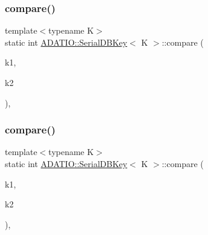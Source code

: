 \subsubsection{\texorpdfstring{compare()}{compare()}\hspace{0.1cm}{\footnotesize\ttfamily [1/2]}}
{\footnotesize\ttfamily template$<$typename K$>$ \\
static int \mbox{\hyperlink{classADATIO_1_1SerialDBKey}{A\+D\+A\+T\+I\+O\+::\+Serial\+D\+B\+Key}}$<$ K $>$\+::compare (\begin{DoxyParamCaption}\item[{const \mbox{\hyperlink{other__libs_2filedb_2filehash_2ffdb__db_8h_aa2e0984399491df0fdd20898ca8758f9}{F\+F\+D\+B\+\_\+\+D\+BT}} $\ast$}]{k1,  }\item[{const \mbox{\hyperlink{other__libs_2filedb_2filehash_2ffdb__db_8h_aa2e0984399491df0fdd20898ca8758f9}{F\+F\+D\+B\+\_\+\+D\+BT}} $\ast$}]{k2 }\end{DoxyParamCaption})\hspace{0.3cm}{\ttfamily [inline]}, {\ttfamily [static]}}

\mbox{\label{classADATIO_1_1SerialDBKey_a5f73c31df1c824c61790ab7645fc030f}} 
\subsubsection{\texorpdfstring{compare()}{compare()}\hspace{0.1cm}{\footnotesize\ttfamily [2/2]}}
{\footnotesize\ttfamily template$<$typename K$>$ \\
static int \mbox{\hyperlink{classADATIO_1_1SerialDBKey}{A\+D\+A\+T\+I\+O\+::\+Serial\+D\+B\+Key}}$<$ K $>$\+::compare (\begin{DoxyParamCaption}\item[{const \mbox{\hyperlink{other__libs_2filedb_2filehash_2ffdb__db_8h_aa2e0984399491df0fdd20898ca8758f9}{F\+F\+D\+B\+\_\+\+D\+BT}} $\ast$}]{k1,  }\item[{const \mbox{\hyperlink{other__libs_2filedb_2filehash_2ffdb__db_8h_aa2e0984399491df0fdd20898ca8758f9}{F\+F\+D\+B\+\_\+\+D\+BT}} $\ast$}]{k2 }\end{DoxyParamCaption})\hspace{0.3cm}{\ttfamily [inline]}, {\ttfamily [static]}}

